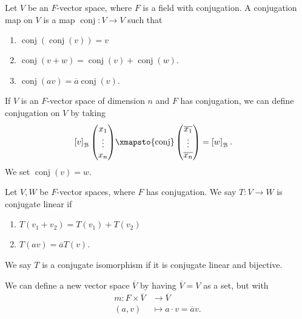 \documentclass[10pt]{mypackage}
\DeclareMathOperator{\conj}{conj}
\begin{document}
  \begin{definition}
    Let $V$ be an $F$-vector space, where $F$ is a field with conjugation. A conjugation map on $V$ is a map $\conj: V\rightarrow V$ such that
    \begin{enumerate}[(1)]
      \item $\conj\left(\conj\left(v\right)\right) = v$
      \item $\conj\left(v + w\right) = \conj\left(v\right) + \conj\left(w\right)$.
      \item $\conj\left(av\right) = \overline{a}\conj(v)$.
    \end{enumerate}
  \end{definition}
  \begin{example}
    If $V$ is an $F$-vector space of dimension $n$ and $F$ has conjugation, we can define conjugation on $V$ by taking
    \begin{align*}
      \left[v\right]_{\mathcal{B}}\begin{pmatrix}x_1\\\vdots\\x_n\end{pmatrix}  &\xmapsto{\conj} \begin{pmatrix}\overline{x_1}\\\vdots\\\overline{x_n}\end{pmatrix} = \left[w\right]_{\mathcal{B}}.
    \end{align*}
    We set $\conj(v) = w$.
  \end{example}
  \begin{definition}
    Let $V,W$ be $F$-vector spaces, where $F$ has conjugation. We say $T: V\rightarrow W$ is conjugate linear if
    \begin{enumerate}[(1)]
      \item $T\left(v_1 + v_2\right) = T\left(v_1\right) + T\left(v_2\right)$
      \item $T\left(av\right) = \overline{a}T\left(v\right)$.
    \end{enumerate}
    We say $T$ is a conjugate isomorphism if it is conjugate linear and bijective.\newline

    We can define a new vector space $\overline{V}$ by having $\overline{V} = V$ as a set, but with
    \begin{align*}
      m: F\times \overline{V} &\rightarrow \overline{V}\\
      \left(a,v\right) &\mapsto a\cdot v = \overline{a}v.
    \end{align*}
    
  \end{definition}
\end{document}
